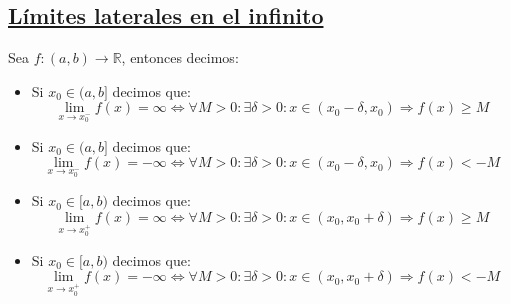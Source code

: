 \documentclass[10pt,a4paper,openright]{book}
\begin{document}
\subsection*{\underline{Límites laterales en el infinito}}
Sea $f: (a,b)\longrightarrow \mathbb R$, entonces decimos:
\begin{itemize}
\item Si $x_0\in (a,b]$ decimos que:
$$\lim_{x\rightarrow x_0^-}f(x)=\infty\Leftrightarrow \forall M>0: \exists \delta>0: x\in (x_0-\delta, x_0)\Rightarrow f(x)\geq M$$

\item Si $x_0\in (a,b]$ decimos que:
$$\lim_{x\rightarrow x_0^-}f(x)=-\infty\Leftrightarrow \forall M>0: \exists \delta>0: x\in (x_0-\delta, x_0)\Rightarrow f(x)< -M$$

\item Si $x_0\in [a,b)$ decimos que:
$$\lim_{x\rightarrow x_0^+}f(x)=\infty\Leftrightarrow \forall M>0: \exists \delta>0: x\in (x_0,x_0+\delta)\Rightarrow f(x)\geq M$$

\item Si $x_0\in [a,b)$ decimos que:
$$\lim_{x\rightarrow x_0^+}f(x)=-\infty\Leftrightarrow \forall M>0: \exists \delta>0: x\in (x_0,x_0+\delta)\Rightarrow f(x)< -M$$
\end{itemize}
\end{document}
